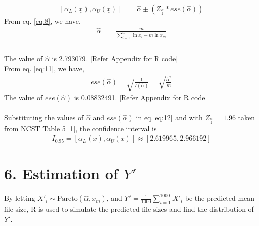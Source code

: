 \documentclass[11pt]{article}
\begin{document}
\begin{equation}
\begin{split}
[\alpha_{L}(\underline x),\alpha_{U}(\underline x)] &= {\hat{\alpha}}\pm({Z_{\frac{\alpha}{2}} * ese(\hat{\alpha})})
\label{eq:12}
\end{split}
\end{equation}
From eq. \eqref{eq:8}, we have,
\begin{equation}
\begin{split}
\hat{\alpha} &= {\frac{m}{\sum_{i=1}^{m} \ln x_i - m\ln{x_m}}}\\
\label{eq:13}
\end{split}
\end{equation}
\\
The value of $ \hat\alpha $ is 2.793079. [Refer Appendix for R code] \\
From eq. \eqref{eq:11}, we have,
\begin{equation}
\begin{split}
ese(\hat{\alpha}) = \sqrt{\frac{1}{I(\hat{\alpha})}} = \sqrt{\frac {\hat{\alpha}^2}{m}}
\end{split}
\end{equation}
The value of $ ese(\hat\alpha) $ is 0.08832491. [Refer Appendix for R code] \\
\\
Substituting the values of $ \hat\alpha $ and $ ese(\hat\alpha) $ in eq.\eqref{eq:12} and with $Z_{\frac{\alpha}{2}} = 1.96$ taken from NCST Table 5 [1], the confidence interval is
\begin{equation}
\begin{split}
I_{0.95} = [\alpha_{L}(\underline x),\alpha_{U}(\underline x)] \approx [ 2.619965 , 2.966192 ]
\end{split}
\end{equation}

\section*{6. Estimation of $Y'$}

\par By letting $X'_{i}\sim\text{Pareto}(\hat{\alpha},x_m)$, and $Y' = \frac{1}{1000}\sum_{i=1}^{1000}X'_{i}$ be the predicted mean file size, R is used to simulate the predicted file sizes and find the distribution of $Y'$. 
\end{document}
